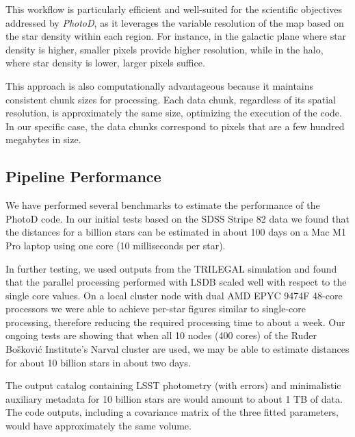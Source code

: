


This workflow is particularly efficient and well-suited for the scientific objectives addressed by {\em PhotoD}, as it leverages the variable resolution of the map based on the star density within each region. For instance, in the galactic plane where star density is higher, smaller pixels provide higher resolution, while in the halo, where star density is lower, larger pixels suffice.

This approach is also computationally advantageous because it maintains consistent chunk sizes for processing. Each data chunk, regardless of its spatial resolution, is approximately the same size, optimizing the execution of the code. In our specific case, the data chunks correspond to pixels that are a few hundred megabytes in size.
 
 
\subsection{Pipeline Performance}

We have performed several benchmarks to estimate the performance of the PhotoD code. In our initial tests based on the SDSS Stripe 82 data we found that the distances for a billion stars can be estimated in about 100 days on a Mac M1 Pro laptop using one core (10 milliseconds per star). 

In further testing, we used outputs from the TRILEGAL simulation and found that the parallel processing performed with LSDB scaled well with respect to the single core values. On a local cluster node with dual AMD EPYC 9474F 48-core processors we were able to achieve per-star figures similar to single-core processing, therefore reducing the required processing time to about a week. Our ongoing tests are showing that when all 10 nodes (400 cores) of the Ruđer Bošković Institute's Narval cluster are used, we may be able to estimate distances for about 10 billion stars in about two days. 

The output catalog containing LSST photometry (with errors) and minimalistic auxiliary metadata for 10 billion stars are would amount to about 1 TB of data. The code outputs, including a covariance matrix of the three fitted parameters, would have approximately the same volume. 
